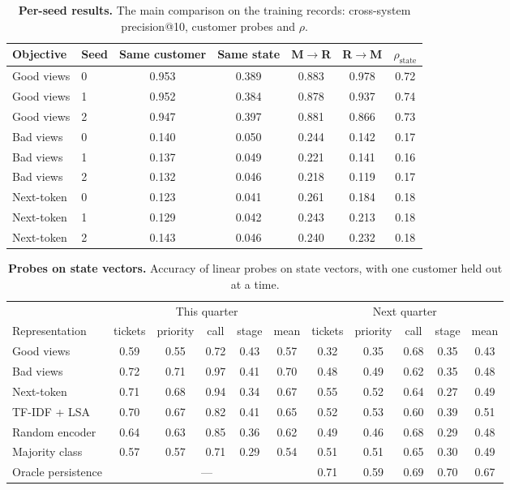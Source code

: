 \documentclass[11pt]{article}
\begin{document}
\begin{table}[h]
\centering
\small
\caption{\textbf{Per-seed results.} The main comparison on the training records: cross-system precision@10, customer probes and $\rho$.}
\label{tab:seeds}
\begin{tabular}{llccccc}
\toprule
Objective & Seed & Same customer & Same state & M$\to$R & R$\to$M & $\rho_{\text{state}}$ \\
\midrule
Good views & 0 & 0.953 & 0.389 & 0.883 & 0.978 & 0.72 \\
Good views & 1 & 0.952 & 0.384 & 0.878 & 0.937 & 0.74 \\
Good views & 2 & 0.947 & 0.397 & 0.881 & 0.866 & 0.73 \\
\addlinespace[2pt]
Bad views & 0 & 0.140 & 0.050 & 0.244 & 0.142 & 0.17 \\
Bad views & 1 & 0.137 & 0.049 & 0.221 & 0.141 & 0.16 \\
Bad views & 2 & 0.132 & 0.046 & 0.218 & 0.119 & 0.17 \\
\addlinespace[2pt]
Next-token & 0 & 0.123 & 0.041 & 0.261 & 0.184 & 0.18 \\
Next-token & 1 & 0.129 & 0.042 & 0.243 & 0.213 & 0.18 \\
Next-token & 2 & 0.143 & 0.046 & 0.240 & 0.232 & 0.18 \\
\bottomrule
\end{tabular}
\end{table}

\begin{table}[h]
\centering
\small
\caption{\textbf{Probes on state vectors.} Accuracy of linear probes on state vectors, with one customer held out at a time.}
\label{tab:state}
\setlength{\tabcolsep}{4pt}\begin{tabular}{lcccccccccc}
\toprule
& \multicolumn{5}{c}{This quarter} & \multicolumn{5}{c}{Next quarter} \\
\cmidrule(lr){2-6}\cmidrule(lr){7-11}
Representation & tickets & priority & call & stage & mean & tickets & priority & call & stage & mean \\
\midrule
Good views & 0.59 & 0.55 & 0.72 & 0.43 & 0.57 & 0.32 & 0.35 & 0.68 & 0.35 & 0.43 \\
Bad views & 0.72 & 0.71 & 0.97 & 0.41 & 0.70 & 0.48 & 0.49 & 0.62 & 0.35 & 0.48 \\
Next-token & 0.71 & 0.68 & 0.94 & 0.34 & 0.67 & 0.55 & 0.52 & 0.64 & 0.27 & 0.49 \\
TF-IDF + LSA & 0.70 & 0.67 & 0.82 & 0.41 & 0.65 & 0.52 & 0.53 & 0.60 & 0.39 & 0.51 \\
Random encoder & 0.64 & 0.63 & 0.85 & 0.36 & 0.62 & 0.49 & 0.46 & 0.68 & 0.29 & 0.48 \\
\midrule
Majority class & 0.57 & 0.57 & 0.71 & 0.29 & 0.54 & 0.51 & 0.51 & 0.65 & 0.30 & 0.49 \\
Oracle persistence & \multicolumn{5}{c}{---} & 0.71 & 0.59 & 0.69 & 0.70 & 0.67 \\
\bottomrule
\end{tabular}
\end{table}
\end{document}
